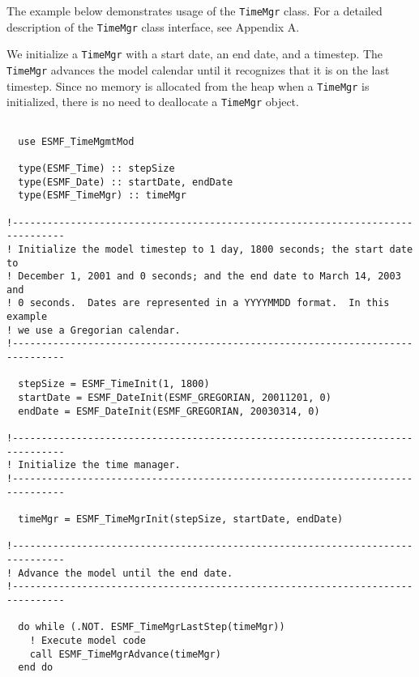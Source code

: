 
The example below demonstrates usage of the {\tt TimeMgr} class.  For
a detailed description of the {\tt TimeMgr} class interface, see 
Appendix A.

We initialize a {\tt TimeMgr} with a start date, an end date, and a timestep.  
The {\tt TimeMgr} advances the model calendar until it recognizes that it is on the last 
timestep.  Since no memory is allocated from the heap when a {\tt TimeMgr} is initialized, 
there is no need to deallocate a {\tt TimeMgr} object.

\begin{verbatim}      

  use ESMF_TimeMgmtMod

  type(ESMF_Time) :: stepSize
  type(ESMF_Date) :: startDate, endDate
  type(ESMF_TimeMgr) :: timeMgr

!-------------------------------------------------------------------------------    
! Initialize the model timestep to 1 day, 1800 seconds; the start date to 
! December 1, 2001 and 0 seconds; and the end date to March 14, 2003 and 
! 0 seconds.  Dates are represented in a YYYYMMDD format.  In this example
! we use a Gregorian calendar. 
!-------------------------------------------------------------------------------

  stepSize = ESMF_TimeInit(1, 1800)
  startDate = ESMF_DateInit(ESMF_GREGORIAN, 20011201, 0)
  endDate = ESMF_DateInit(ESMF_GREGORIAN, 20030314, 0)

!-------------------------------------------------------------------------------    
! Initialize the time manager.
!-------------------------------------------------------------------------------

  timeMgr = ESMF_TimeMgrInit(stepSize, startDate, endDate)

!-------------------------------------------------------------------------------    
! Advance the model until the end date.
!-------------------------------------------------------------------------------

  do while (.NOT. ESMF_TimeMgrLastStep(timeMgr))
    ! Execute model code
    call ESMF_TimeMgrAdvance(timeMgr)
  end do

\end{verbatim}





